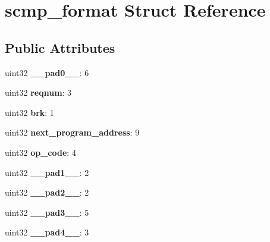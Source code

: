 \hypertarget{structscmp__format}{}\section{scmp\+\_\+format Struct Reference}
\label{structscmp__format}
\subsection*{Public Attributes}
\begin{DoxyCompactItemize}
\item 
\mbox{\label{structscmp__format_ae90290ced13da56992ef1415c148bb67}} 
uint32 {\bfseries \+\_\+\+\_\+pad0\+\_\+\+\_\+}\+: 6
\item 
\mbox{\label{structscmp__format_a5c18d2d806e83be2ee8fac142c42dbdd}} 
uint32 {\bfseries reqnum}\+: 3
\item 
\mbox{\label{structscmp__format_a41122e746dc2793153a70fb1c3eceafd}} 
uint32 {\bfseries brk}\+: 1
\item 
\mbox{\label{structscmp__format_af5ccf25788fa0afa3493b9f17bc854e2}} 
uint32 {\bfseries next\+\_\+program\+\_\+address}\+: 9
\item 
\mbox{\label{structscmp__format_a5096c049ef63ca0bac5006a5618c6136}} 
uint32 {\bfseries op\+\_\+code}\+: 4
\item 
\mbox{\label{structscmp__format_a5ce4c1c412df125125675362413f70d7}} 
uint32 {\bfseries \+\_\+\+\_\+pad1\+\_\+\+\_\+}\+: 2
\item 
\mbox{\label{structscmp__format_a9660ba01c6da39c00deb885af68b5c63}} 
uint32 {\bfseries \+\_\+\+\_\+pad2\+\_\+\+\_\+}\+: 2
\item 
\mbox{\label{structscmp__format_a9b9972958c488b44138c778f3131f2bc}} 
uint32 {\bfseries \+\_\+\+\_\+pad3\+\_\+\+\_\+}\+: 5
\item 
\mbox{\label{structscmp__format_a06c0cfb061fb5b78804ce8280666e5ef}} 
uint32 {\bfseries \+\_\+\+\_\+pad4\+\_\+\+\_\+}\+: 3

\end{DoxyCompactItemize}
